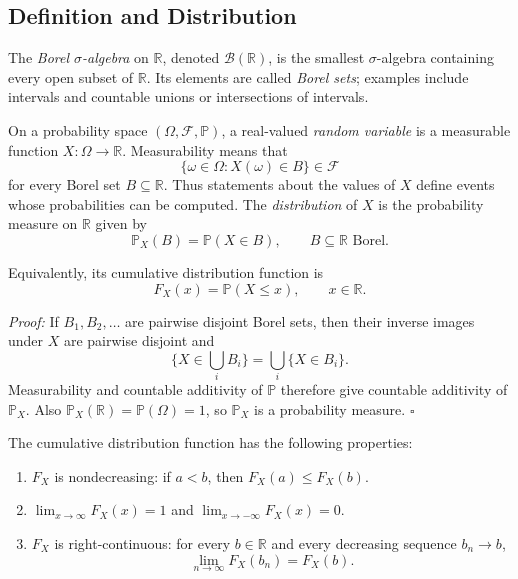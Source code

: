 \documentclass[a4paper,11pt,abstracton]{scrartcl}
\theoremstyle{dotlessP}
\theoremstyle{dotlessS}
\theoremstyle{remark}
\theoremstyle{definition}
\begin{document}
\subsection{Definition and Distribution}

The \emph{Borel $\sigma$-algebra} on $\mathbb{R}$, denoted $\mathcal{B}(\mathbb{R})$, is the smallest $\sigma$-algebra containing every open subset of $\mathbb{R}$. Its elements are called \emph{Borel sets}; examples include intervals and countable unions or intersections of intervals.

On a probability space $(\Omega,\mathcal{F},\mathbb{P})$, a real-valued \emph{random variable} is a measurable function $X:\Omega\to\mathbb{R}$. Measurability means that
\[
  \{\omega\in\Omega:X(\omega)\in B\}\in\mathcal{F}
\]
for every Borel set $B\subseteq\mathbb{R}$. Thus statements about the values of $X$ define events whose probabilities can be computed. The \emph{distribution} of $X$ is the probability measure on $\mathbb{R}$ given by
\[
  \mathbb{P}_X(B)=\mathbb{P}(X\in B),
  \qquad B\subseteq\mathbb{R}\text{ Borel}.
\]
\begin{problem_box}
Equivalently, its cumulative distribution function is
\[
  F_X(x)=\mathbb{P}(X\leq x),\qquad x\in\mathbb{R}.
\]
\end{problem_box}

\begin{claim_box}
\textit{Proof:} If $B_1,B_2,\ldots$ are pairwise disjoint Borel sets, then their inverse images under $X$ are pairwise disjoint and
\[
  \{X\in\bigcup_i B_i\}=\bigcup_i\{X\in B_i\}.
\]
Measurability and countable additivity of $\mathbb{P}$ therefore give countable additivity of $\mathbb{P}_X$. Also $\mathbb{P}_X(\mathbb{R})=\mathbb{P}(\Omega)=1$, so $\mathbb{P}_X$ is a probability measure.
\hfill$\square$
\end{claim_box}

\begin{problem_box}
The cumulative distribution function has the following properties:
\begin{enumerate}
  \item $F_X$ is nondecreasing: if $a<b$, then $F_X(a)\leq F_X(b)$.
  \item $\displaystyle\lim_{x\to\infty}F_X(x)=1$ and $\displaystyle\lim_{x\to-\infty}F_X(x)=0$.
  \item $F_X$ is right-continuous: for every $b\in\mathbb{R}$ and every decreasing sequence $b_n\to b$,
  \[
    \lim_{n\to\infty}F_X(b_n)=F_X(b).
  \]
\end{enumerate}
\end{problem_box}
\end{document}
